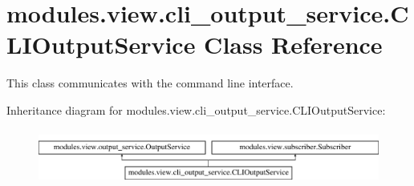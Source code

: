 \hypertarget{classmodules_1_1view_1_1cli__output__service_1_1_c_l_i_output_service}{}\section{modules.\+view.\+cli\+\_\+output\+\_\+service.\+C\+L\+I\+Output\+Service Class Reference}
\label{classmodules_1_1view_1_1cli__output__service_1_1_c_l_i_output_service}


This class communicates with the command line interface.  


Inheritance diagram for modules.\+view.\+cli\+\_\+output\+\_\+service.\+C\+L\+I\+Output\+Service\+:\begin{figure}[H]
\begin{center}
\leavevmode
\includegraphics[height=1.824104cm]{classmodules_1_1view_1_1cli__output__service_1_1_c_l_i_output_service}
\end{center}
\end{figure}
